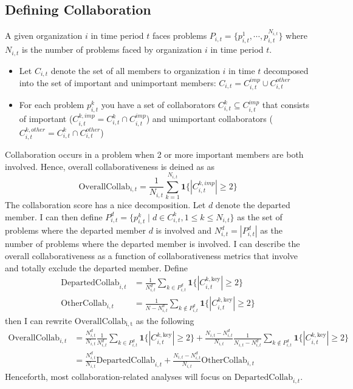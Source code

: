\documentclass[12pt,notitlepage]{article}
\begin{document}
\subsection{Defining Collaboration} \label{sec:defining_collab}
A given organization $i$ in time period $t$ faces problems $P_{i,t} = \{p_{i,t}^1, \cdots, p_{i,t}^{N_{i,t}} \}$ where $N_{i,t}$ is the number of problems faced by organization $i$ in time period $t$. 
\begin{itemize}
\item Let $C_{i,t}$ denote the set of all members to organization $i$ in time $t$ decomposed into the set of important and unimportant members: $C_{i,t} = C_{i,t}^{imp} \cup C_{i,t}^{other}$ 
\item For each problem $p_{i,t}^k$ you have a set of collaborators $C_{i,t}^{k} \subseteq C_{i,t}^{imp} $ that consists of important ($C_{i,t}^{k, imp} = C_{i,t}^{k} \cap C_{i,t}^{imp}$) and unimportant collaborators ($C_{i,t}^{k, other} = C_{i,t}^{k} \cap C_{i,t}^{other}$)
\end{itemize}
Collaboration occurs in a problem when 2 or more important members are both involved. Hence, overall collaborativeness is deined as as 
\begin{equation}
\mathrm{OverallCollab}_{i,t} = \frac{1}{N_{i,t}}\sum_{k=1}^{N_{i,t}}\mathbf{1}\bigl\{|C_{i,t}^{k,imp}|\ge2\bigr\}
\end{equation}
The collaboration score has a nice decomposition. Let $d$ denote the departed member. I can then define $P_{i,t}^d = \{p_{i,t}^{k} \mid d \in C_{i,t}^k, 1 \leq k \leq N_{i,t} \}$ as the set of problems where the departed member $d$ is involved and $N_{i, t}^d = |P_{i,t}^d|$ as the number of problems where the departed member is involved. 
I can describe the overall collaborativeness as a function of collaborativeness metrics that involve and totally exclude the departed member. 
Define 
\begin{align*}
 \mathrm{DepartedCollab}_{i,t} &= \frac{1}{N_{i,t}^d} \sum_{k \in P_{i,t}^d} \mathbf{1}\bigl\{|C_{i,t}^{k,\mathrm{key}}|\ge2\bigr\} \\
 \mathrm{OtherCollab}_{i,t} &= \frac{1}{N-N_{i,t}^{d}} \sum_{k \notin P_{i,t}^d} \mathbf{1}\bigl\{|C_{i,t}^{k,\mathrm{key}}|\ge2\bigr\}
\end{align*}
then I can rewrite $\mathrm{OverallCollab_{i,t}}$ as the following
\begin{align*}
\mathrm{OverallCollab}_{i,t} &= \frac{N_{i,t}^d}{N_{i,t}} \frac{1}{N_{i,t}^d} \sum_{k \in P_{i,t}^d} \mathbf{1}\bigl\{|C_{i,t}^{k,\mathrm{key}}|\ge2\bigr\} + \frac{N_{i,t}-N_{i,t}^{d}}{N_{i,t}} \frac{1}{N_{i,t}-N_{i,t}^{d}} \sum_{k \notin P_{i,t}^d} \mathbf{1}\bigl\{|C_{i,t}^{k,\mathrm{key}}|\ge2\bigr\} \\
&= \frac{N_{i,t}^d}{N_{i,t}}\mathrm{DepartedCollab}_{i,t} + \frac{N_{i,t}-N_{i,t}^{d}}{N_{i,t}} \mathrm{OtherCollab}_{i,t}
\end{align*}
Henceforth, most collaboration-related analyses will focus on $\mathrm{DepartedCollab}_{i,t}$. 
\end{document}
